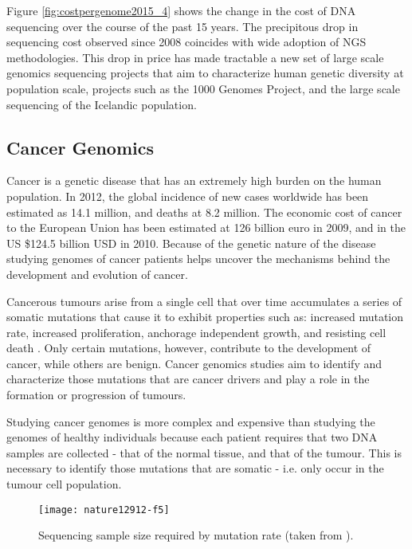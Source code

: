 Figure \ref{fig:costpergenome2015_4} shows the change in the cost of DNA sequencing over the course of the past 15 years. The precipitous drop in sequencing cost observed since 2008 coincides with wide adoption of NGS methodologies. This drop in price has made tractable a new set of large scale genomics sequencing projects that aim to characterize human genetic diversity at population scale, projects such as the 1000 Genomes Project\autocite{10002010map}, and the large scale sequencing of the Icelandic population\autocite{gudbjartsson2015large}.

\subsection{Cancer Genomics}
Cancer is a genetic disease that has an extremely high burden on the human population. In 2012, the global incidence of new cases worldwide has been estimated as 14.1 million, and deaths at 8.2 million\autocite{torre2015global}. The economic cost of cancer to the European Union has been estimated at 126 billion euro in 2009\autocite{luengo2013economic}, and in the US \$124.5 billion USD in 2010\autocite{yabroff2011economic}. Because of the genetic nature of the disease studying genomes of cancer patients helps uncover the mechanisms behind the development and evolution of cancer\autocite{stratton2009cancer}.

Cancerous tumours arise from a single cell that over time accumulates a series of somatic mutations that cause it to exhibit properties such as: increased mutation rate, increased proliferation, anchorage independent growth, and resisting cell death\autocite{hanahan2011hallmarks} . Only certain mutations, however, contribute to the development of cancer, while others are benign. Cancer genomics studies aim to identify and characterize those mutations that are cancer drivers and play a role in the formation or progression of tumours\autocite{stratton2009cancer}. 

Studying cancer genomes is more complex and expensive than studying the genomes of healthy individuals because each patient requires that two DNA samples are collected - that of the normal tissue, and that of the tumour. This is necessary to identify those mutations that are somatic - i.e. only occur in the tumour cell population\autocite{roberts2013comparative}.


\begin{figure}[H]
\texttt{[image: nature12912-f5]}
\centering
\caption {Sequencing sample size required by mutation rate (taken from \autocite{lawrence2014discovery}).}
\label{fig:nature12912-f5}
\end{figure}

